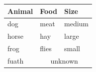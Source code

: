\documentclass{article}
\begin{document}
\begin{tabular}{lll}
\toprule
Animal & Food & Size \\
\midrule
dog & meat & medium \\
horse & hay & large \\
frog & flies & small \\
fuath & \multicolumn{2}{c}{unknown} \\
\bottomrule
\end{tabular}
\end{document}
